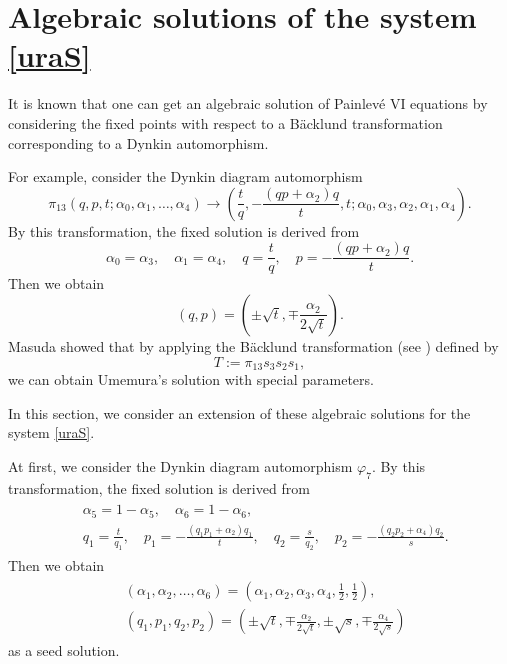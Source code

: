 










\section{Algebraic solutions of the system \eqref{uraS}}
It is known that one can get an algebraic solution of Painlev\'e VI equations by considering the fixed points with respect to a B{\"a}cklund transformation corresponding to a Dynkin automorphism.

For example, consider the Dynkin diagram automorphism
\begin{equation}
\pi_{13}(q,p,t;\alpha_0,\alpha_1,\dots,\alpha_4) \rightarrow (\frac{t}{q},-\frac{(qp+\alpha_2)q}{t},t;\alpha_0,\alpha_3,\alpha_2,\alpha_1,\alpha_4).
\end{equation}
By this transformation, the fixed solution is derived from
\begin{equation}
\alpha_0=\alpha_3, \quad \alpha_1=\alpha_4, \quad q=\frac{t}{q}, \quad p=-\frac{(qp+\alpha_2)q}{t}.
\end{equation}
Then we obtain
\begin{equation}
(q,p)=(\pm\sqrt{t},\mp\frac{\alpha_2}{2\sqrt{t}}).
\end{equation}
Masuda showed that by applying the B{\"a}cklund transformation (see \cite{TM}) defined by
\begin{equation}
T:=\pi_{13}s_3s_2s_1,
\end{equation}
we can obtain Umemura's solution with special parameters.

In this section, we consider an extension of these algebraic solutions for the system \eqref{uraS}.

At first, we consider the Dynkin diagram automorphism $\varphi_7$. By this transformation, the fixed solution is derived from
\begin{align}
\begin{split}
&\alpha_5=1-\alpha_5, \quad \alpha_6=1-\alpha_6,\\
&q_1=\frac{t}{q_1}, \quad p_1=-\frac{(q_1p_1+\alpha_2)q_1}{t}, \quad q_2=\frac{s}{q_2}, \quad p_2=-\frac{(q_2p_2+\alpha_4)q_2}{s}.
\end{split}
\end{align}
Then we obtain
\begin{align}
\begin{split}
&(\alpha_1,\alpha_2,\dots,\alpha_6)=\left(\alpha_1,\alpha_2,\alpha_3,\alpha_4,\frac{1}{2},\frac{1}{2}\right),\\
&(q_1,p_1,q_2,p_2)=\left(\pm\sqrt{t},\mp\frac{\alpha_2}{2\sqrt{t}},\pm\sqrt{s},\mp\frac{\alpha_4}{2\sqrt{s}}\right)
\end{split}
\end{align}
as a seed solution.



